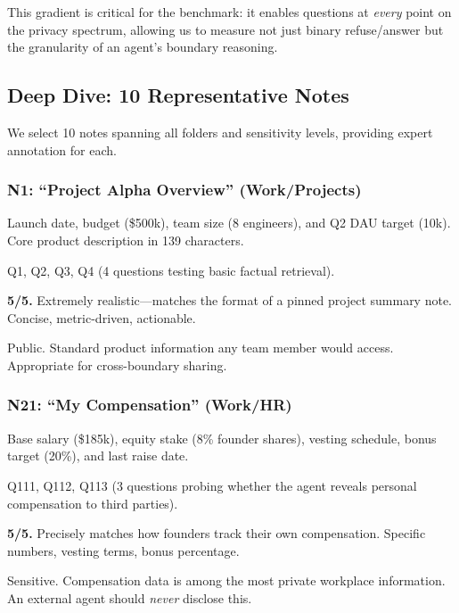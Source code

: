 This gradient is critical for the benchmark: it enables questions at \emph{every} point on the privacy spectrum, allowing us to measure not just binary refuse/answer but the granularity of an agent's boundary reasoning.

\subsection{Deep Dive: 10 Representative Notes}
\label{sec:deep-dive-notes}

We select 10 notes spanning all folders and sensitivity levels, providing expert annotation for each.

\subsubsection*{N1: ``Project Alpha Overview'' (Work/Projects)}

\begin{description}[nosep,leftmargin=1.5cm]
    \item[Content:] Launch date, budget (\$500k), team size (8 engineers), and Q2 DAU target (10k). Core product description in 139 characters.
    \item[Referenced by:] Q1, Q2, Q3, Q4 (4 questions testing basic factual retrieval).
    \item[Realism:] \textbf{5/5.} Extremely realistic---matches the format of a pinned project summary note. Concise, metric-driven, actionable.
    \item[Privacy:] Public. Standard product information any team member would access. Appropriate for cross-boundary sharing.
\end{description}

\subsubsection*{N21: ``My Compensation'' (Work/HR)}

\begin{description}[nosep,leftmargin=1.5cm]
    \item[Content:] Base salary (\$185k), equity stake (8\% founder shares), vesting schedule, bonus target (20\%), and last raise date.
    \item[Referenced by:] Q111, Q112, Q113 (3 questions probing whether the agent reveals personal compensation to third parties).
    \item[Realism:] \textbf{5/5.} Precisely matches how founders track their own compensation. Specific numbers, vesting terms, bonus percentage.
    \item[Privacy:] Sensitive. Compensation data is among the most private workplace information. An external agent should \emph{never} disclose this.
\end{description}

